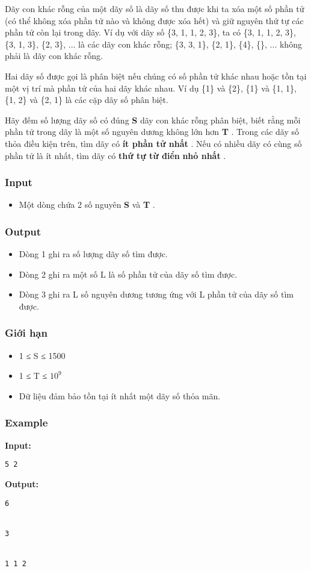



   Dãy con khác rỗng của một dãy số là dãy số thu được khi ta xóa một số phần tử (có thể không xóa phần tử nào và không được xóa hết) và giữ nguyên thứ tự các phần tử còn lại trong dãy. Ví dụ với dãy số \{3, 1, 1, 2, 3\}, ta có \{3, 1, 1, 2, 3\}, \{3, 1, 3\}, \{2, 3\}, ... là các dãy con khác rỗng; \{3, 3, 1\}, \{2, 1\}, \{4\}, \{\}, ... không phải là dãy con khác rỗng.  

   Hai dãy số được gọi là phân biệt nếu chúng có số phần tử khác nhau hoặc tồn tại một vị trí mà phần tử của hai dãy khác nhau. Ví dụ \{1\} và \{2\}, \{1\} và \{1, 1\}, \{1, 2\} và \{2, 1\} là các cặp dãy số phân biệt.  

   Hãy đếm số lượng dãy số có đúng   \textbf{    S   }   dãy con khác rỗng phân biệt, biết rằng mỗi phần tử trong dãy là một số nguyên dương không lớn hơn   \textbf{    T   }   . Trong các dãy số thỏa điều kiện trên, tìm dãy có   \textbf{    ít phần tử nhất   }   . Nếu có nhiều dãy có cùng số phần tử là ít nhất, tìm dãy có   \textbf{    thứ tự từ điển   }\textbf{    nhỏ nhất   }   .  

\subsubsection{   Input  }
\begin{itemize}
	\item     Một dòng chứa 2 số nguyên    \textbf{     S    }    và    \textbf{     T    }    .   
\end{itemize}

\subsubsection{   Output  }
\begin{itemize}
	\item     Dòng 1 ghi ra số lượng dãy số tìm được.   
	\item     Dòng 2 ghi ra một số L là số phần tử của dãy số tìm được.   
	\item     Dòng 3 ghi ra L số nguyên dương tương ứng với L phần tử của dãy số tìm được.   
\end{itemize}

\subsubsection{   Giới hạn  }
\begin{itemize}
	\item     1 ≤ S ≤ 1500   
	\item     1 ≤ T ≤ $10^{9}$
	\item     Dữ liệu đảm bảo tồn tại ít nhất một dãy số thỏa mãn.   
\end{itemize}

\subsubsection{   Example  }

\textbf{    Input:   }
\begin{verbatim}
5 2\end{verbatim}

\textbf{    Output:   }
\begin{verbatim}
6


3


1 1 2 


\end{verbatim}
